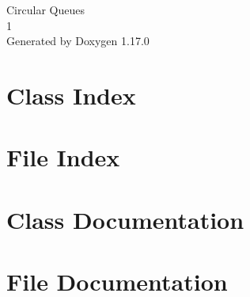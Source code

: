\documentclass[twoside]{book}
\newcommand{\+}{\discretionary{\mbox{\scriptsize$\hookleftarrow$}}{}{}}
\newcommand{\clearemptydoublepage}{%
    \newpage{\pagestyle{empty}\cleardoublepage}%
  }
\begin{document}
  \raggedbottom
    \hypersetup{pageanchor=false,
                bookmarksnumbered=true,
                pdfencoding=unicode
               }
  \begin{titlepage}
  \vspace*{7cm}
  \begin{center}%
  {\Large Circular Queues}\\
  [1ex]\large 1 \\
  \vspace*{1cm}
  {\large Generated by Doxygen 1.17.0}\\
  \end{center}
  \end{titlepage}
  \clearemptydoublepage
  \tableofcontents
  \clearemptydoublepage
  \hypersetup{pageanchor=true}

\chapter{Class Index}

\chapter{File Index}

\chapter{Class Documentation}

\chapter{File Documentation}

  \backmatter
  \newpage
  \clearemptydoublepage
  \printindex
\end{document}
